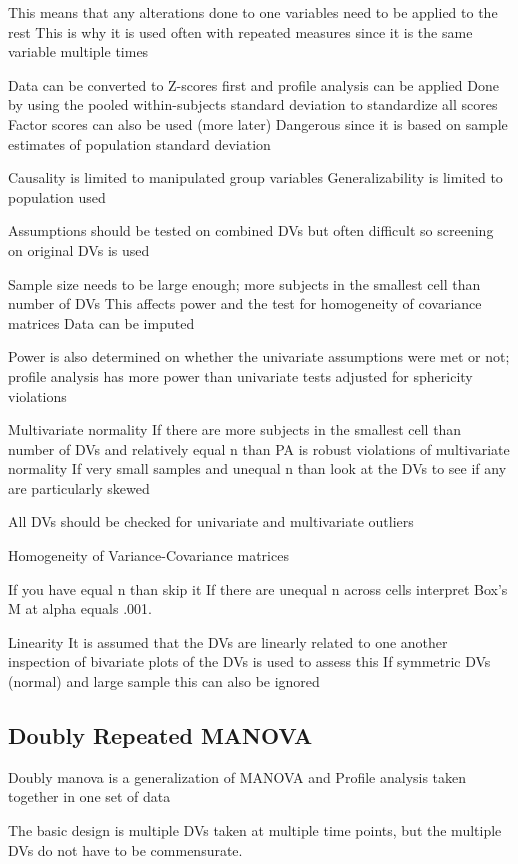 \documentclass[]{book}
\theoremstyle{definition}
\theoremstyle{definition}
\theoremstyle{definition}
\theoremstyle{remark}
\begin{document}
{This means that any alterations done to one variables need to be applied
to the rest This is why it is used often with repeated measures since it
is the same variable multiple times

Data can be converted to Z-scores first and profile analysis can be
applied Done by using the pooled within-subjects standard deviation to
standardize all scores Factor scores can also be used (more later)
Dangerous since it is based on sample estimates of population standard
deviation

Causality is limited to manipulated group variables Generalizability is
limited to population used

Assumptions should be tested on combined DVs but often difficult so
screening on original DVs is used

Sample size needs to be large enough; more subjects in the smallest cell
than number of DVs This affects power and the test for homogeneity of
covariance matrices Data can be imputed

Power is also determined on whether the univariate assumptions were met
or not; profile analysis has more power than univariate tests adjusted
for sphericity violations

Multivariate normality If there are more subjects in the smallest cell
than number of DVs and relatively equal n than PA is robust violations
of multivariate normality If very small samples and unequal n than look
at the DVs to see if any are particularly skewed

All DVs should be checked for univariate and multivariate outliers

Homogeneity of Variance-Covariance matrices

If you have equal n than skip it If there are unequal n across cells
interpret Box's M at alpha equals .001.

Linearity It is assumed that the DVs are linearly related to one another
inspection of bivariate plots of the DVs is used to assess this If
symmetric DVs (normal) and large sample this can also be ignored

\subsection{Doubly Repeated MANOVA}\label{doubly-repeated-manova}

Doubly manova is a generalization of MANOVA and Profile analysis taken
together in one set of data

The basic design is multiple DVs taken at multiple time points, but the
multiple DVs do not have to be commensurate.

}
\end{document}
